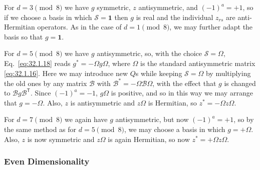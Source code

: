 For \(d=3\pmod 8\) we have \(g\) symmetric, \(z\) antisymmetric, and
\((-1)^a=+1\), so if we choose a basis in which
\(\mathcal S=\mathbf{1}\) then \(g\) is real and the individual \(z_{rs}\)
are anti-Hermitian operators. As in the case of \(d=1\pmod 8\), we may
further adapt the basis so that \(g=\mathbf{1}\).

For \(d=5\pmod 8\) we have \(g\) antisymmetric, so, with the choice
\(\mathcal S=\Omega\), Eq.~\eqref{eq:32.1.18} reads
\(g^*=-\Omega g\Omega\), where \(\Omega\) is the standard antisymmetric
matrix \eqref{eq:32.1.16}. Here we may introduce new \(Q\)s while keeping
\(\mathcal S=\Omega\) by multiplying the old ones by any matrix
\(\mathcal B\) with \(\mathcal B^*=-\Omega\mathcal B\Omega\), with the
effect that \(g\) is changed to \(\mathcal B g\mathcal B^{\mathsf T}\).
Since \((-1)^a=-1\), \(g\Omega\) is positive, and so in this way we may
arrange that \(g=-\Omega\). Also, \(z\) is antisymmetric and \(z\Omega\)
is Hermitian, so \(z^*=-\Omega z\Omega\).

For \(d=7\pmod 8\) we again have \(g\) antisymmetric, but now
\((-1)^a=+1\), so by the same method as for \(d=5\pmod 8\), we may choose
a basis in which \(g=+\Omega\). Also, \(z\) is now symmetric and
\(z\Omega\) is again Hermitian, so now \(z^*=+\Omega z\Omega\).

\subsubsection*{Even Dimensionality}

